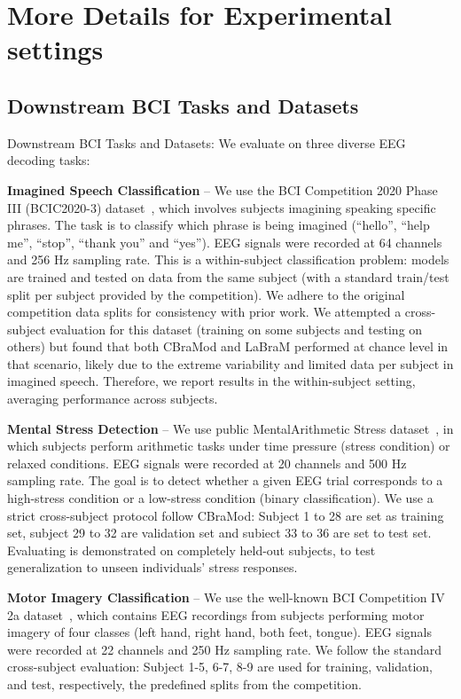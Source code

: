 \section{More Details for Experimental settings}

\subsection{Downstream BCI Tasks and Datasets}
\label{sec:Appendix_datasets}
Downstream BCI Tasks and Datasets: We evaluate on three diverse EEG decoding tasks:

\textbf{Imagined Speech Classification} – We use the BCI Competition 2020 Phase III (BCIC2020-3) dataset~\citep{jeong20222020}, which involves subjects imagining speaking specific phrases. The task is to classify which phrase is being imagined  (“hello”, “help me”, “stop”, “thank you” and “yes”). EEG signals were recorded at 64 channels and 256 Hz sampling rate. This is a within-subject classification problem: models are trained and tested on data from the same subject (with a standard train/test split per subject provided by the competition). We adhere to the original competition data splits for consistency with prior work. We attempted a cross-subject evaluation for this dataset (training on some subjects and testing on others) but found that both CBraMod and LaBraM performed at chance level in that scenario, likely due to the extreme variability and limited data per subject in imagined speech. Therefore, we report results in the within-subject setting, averaging performance across subjects.

\textbf{Mental Stress Detection} – We use public MentalArithmetic Stress dataset~\citep{goldberger2000physiobank,zyma2019electroencephalograms}, in which subjects perform arithmetic tasks under time pressure (stress condition) or relaxed conditions. EEG signals were recorded at 20 channels and 500 Hz sampling rate. The goal is to detect whether a given EEG trial corresponds to a high-stress condition or a low-stress condition (binary classification). We use a strict cross-subject protocol follow CBraMod: Subject 1 to 28 are set as training set, subject 29 to 32 are validation set and subiect 33 to 36 are set to test set. Evaluating is demonstrated on completely held-out subjects, to test generalization to unseen individuals’ stress responses.

\textbf{Motor Imagery Classification} – We use the well-known BCI Competition IV 2a dataset~\citep{brunner2008bci}, which contains EEG recordings from subjects performing motor imagery of four classes (left hand, right hand, both feet, tongue). EEG signals were recorded at 22 channels and 250 Hz sampling rate. We follow the standard cross-subject evaluation: Subject 1-5, 6-7, 8-9 are used for training, validation, and test, respectively, the predefined splits from the competition.


